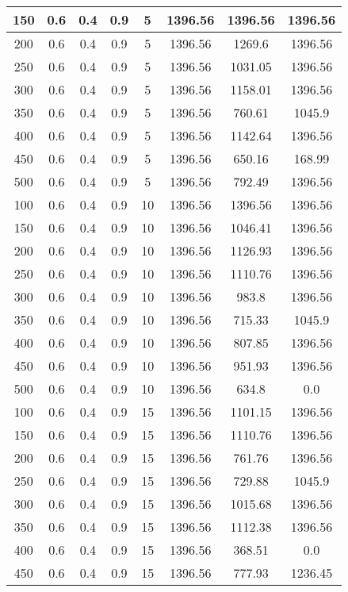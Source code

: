 \documentclass[a4paper, 12pt]{extreport}
\begin{document}
\begin{itemize}
\begin{longtable}{|c|c|c|c|c|c|c|c|}
			150 & 0.6 & 0.4 & 0.9 & 5 & 1396.56 & 1396.56 & 1396.56 \\\hline
			200 & 0.6 & 0.4 & 0.9 & 5 & 1396.56 & 1269.6 & 1396.56 \\\hline
			250 & 0.6 & 0.4 & 0.9 & 5 & 1396.56 & 1031.05 & 1396.56 \\\hline
			300 & 0.6 & 0.4 & 0.9 & 5 & 1396.56 & 1158.01 & 1396.56 \\\hline
			350 & 0.6 & 0.4 & 0.9 & 5 & 1396.56 & 760.61 & 1045.9 \\\hline
			400 & 0.6 & 0.4 & 0.9 & 5 & 1396.56 & 1142.64 & 1396.56 \\\hline
			450 & 0.6 & 0.4 & 0.9 & 5 & 1396.56 & 650.16 & 168.99 \\\hline
			500 & 0.6 & 0.4 & 0.9 & 5 & 1396.56 & 792.49 & 1396.56 \\\hline
			100 & 0.6 & 0.4 & 0.9 & 10 & 1396.56 & 1396.56 & 1396.56 \\\hline
			150 & 0.6 & 0.4 & 0.9 & 10 & 1396.56 & 1046.41 & 1396.56 \\\hline
			200 & 0.6 & 0.4 & 0.9 & 10 & 1396.56 & 1126.93 & 1396.56 \\\hline
			250 & 0.6 & 0.4 & 0.9 & 10 & 1396.56 & 1110.76 & 1396.56 \\\hline
			300 & 0.6 & 0.4 & 0.9 & 10 & 1396.56 & 983.8 & 1396.56 \\\hline
			350 & 0.6 & 0.4 & 0.9 & 10 & 1396.56 & 715.33 & 1045.9 \\\hline
			400 & 0.6 & 0.4 & 0.9 & 10 & 1396.56 & 807.85 & 1396.56 \\\hline
			450 & 0.6 & 0.4 & 0.9 & 10 & 1396.56 & 951.93 & 1396.56 \\\hline
			500 & 0.6 & 0.4 & 0.9 & 10 & 1396.56 & 634.8 & 0.0 \\\hline
			100 & 0.6 & 0.4 & 0.9 & 15 & 1396.56 & 1101.15 & 1396.56 \\\hline
			150 & 0.6 & 0.4 & 0.9 & 15 & 1396.56 & 1110.76 & 1396.56 \\\hline
			200 & 0.6 & 0.4 & 0.9 & 15 & 1396.56 & 761.76 & 1396.56 \\\hline
			250 & 0.6 & 0.4 & 0.9 & 15 & 1396.56 & 729.88 & 1045.9 \\\hline
			300 & 0.6 & 0.4 & 0.9 & 15 & 1396.56 & 1015.68 & 1396.56 \\\hline
			350 & 0.6 & 0.4 & 0.9 & 15 & 1396.56 & 1112.38 & 1396.56 \\\hline
			400 & 0.6 & 0.4 & 0.9 & 15 & 1396.56 & 368.51 & 0.0 \\\hline
			450 & 0.6 & 0.4 & 0.9 & 15 & 1396.56 & 777.93 & 1236.45 \\\hline

\end{longtable}
\end{itemize}
\end{document}
